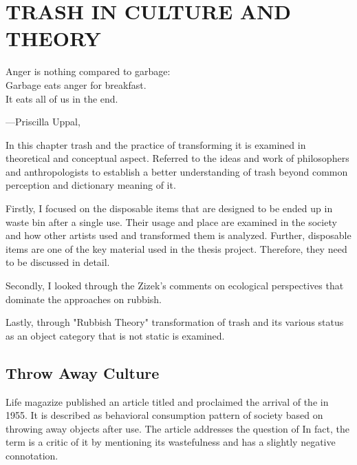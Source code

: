 \chapter{TRASH IN CULTURE AND THEORY}




\begin{singlespace}
\epigraph{Anger is nothing compared to garbage:\\Garbage eats anger for breakfast.\\It eats all of us in the end.}{\hfill---Priscilla Uppal, }
\end{singlespace}




%
%
In this chapter trash and the practice of transforming it is examined in theoretical and conceptual aspect. Referred to the ideas and work of philosophers and anthropologists to establish a better understanding of trash beyond common perception and dictionary meaning of it. 

Firstly, I focused on the disposable items that are designed to be ended up in waste bin after a single use. Their usage and place are examined in the society and how other artists used and transformed them is analyzed. Further, disposable items are one of the key material used in the thesis project. Therefore, they need to be discussed in detail.

Secondly, I looked through the Zizek's comments on ecological perspectives that dominate the approaches on rubbish.

Lastly, through "Rubbish Theory" transformation of trash and its various status as an object category that is not static is examined.  





%
%
\section{Throw Away Culture}





Life magazize published an article titled  and proclaimed the arrival of the  in 1955. It is described as behavioral consumption pattern of society based on throwing away objects after use. The article addresses the question of 
 \citep{tully2014throw} In fact, the term   is a critic of it by mentioning its wastefulness and has a slightly negative connotation. 

